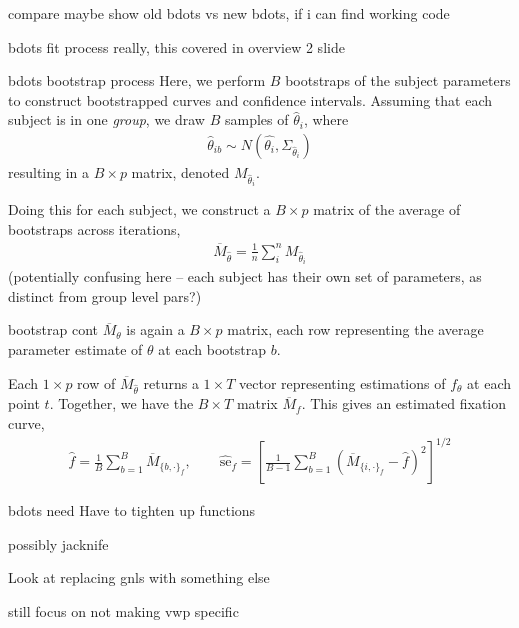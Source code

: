 \documentclass{beamer}
\begin{document}
\begin{frame}{compare}
maybe show old bdots vs new bdots, if i can find working code
\end{frame}

\begin{frame}{bdots fit process}
really, this covered in overview 2 slide
\end{frame}

\begin{frame}{bdots bootstrap process}
Here, we perform $B$ bootstraps of the subject parameters to construct bootstrapped curves and confidence intervals. Assuming that each subject is in one \textit{group}, we draw $B$ samples of $\hat{\theta}_i$, where 
\begin{align*}
\hat{\theta}_{ib} \sim N \left(\hat{\theta_i},  \Sigma_{\hat{\theta}_i} \right)
\end{align*}
resulting in a $B\times p$ matrix, denoted $M_{\hat{\theta}_i}$. \newline 

Doing this for each subject, we construct a $B\times p$ matrix of the average of bootstraps across iterations, 
\begin{align*}
\overline{M}_{\hat{\theta}} = \frac1n \sum_{i}^n M_{\hat{\theta}_i}
\end{align*}
(potentially confusing here -- each subject has their own set of parameters, as distinct from group level pars?)
\end{frame}

\begin{frame}{bootstrap cont}
$\overline{M}_{\theta}$ is again a $B \times p$ matrix, each row  representing the average parameter estimate of $\theta$ at each bootstrap $b$. \newline 

Each $1\times p$ row of $\overline{M}_{\hat{\theta}}$ returns a $1 \times T$ vector representing estimations of $f_{\theta}$ at each point $t$. Together, we have the $B \times T$ matrix $\overline{M}_f$. This gives an estimated fixation curve, 
\begin{align*}
\hat{f} = \frac1B \sum_{b=1}^B \overline{M}_{\{b, \cdot\}_f}, \qquad \widehat{\text{se}}_{f} = \left[ \frac{1}{B-1} \sum_{b=1}^B \left( \overline{M}_{\{i, \cdot\}_{f}} - \hat{f} \right)^2 \right]^{1/2} 
\end{align*}
\end{frame}

\begin{frame}{bdots need}
Have to tighten up functions \newline 

possibly jacknife \newline 

Look at replacing gnls with something else \newline 

still focus on not making vwp specific
\end{frame}
\end{document}
